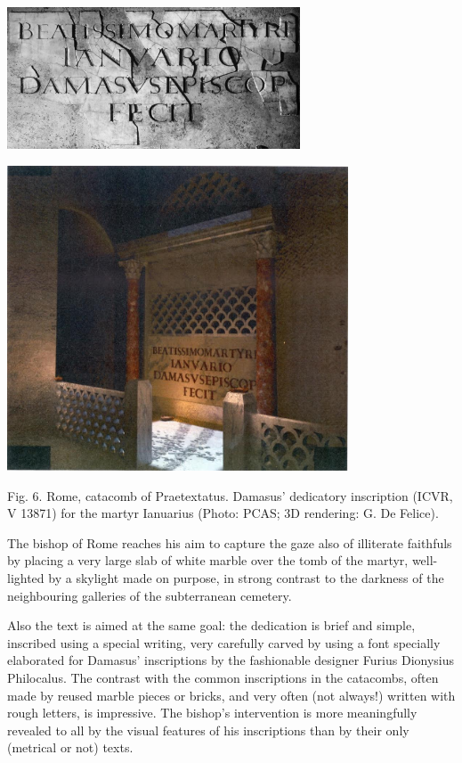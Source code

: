 \documentclass[amsthm,ebook]{saparticle}
\begin{document}
 \includegraphics[width=8.692cm,height=4.21cm]{FelleVisualFeaturesofinscriptionsEAGLE2016FullPaper-img008.jpg} 

 \includegraphics[width=10.141cm,height=9.059cm]{FelleVisualFeaturesofinscriptionsEAGLE2016FullPaper-img009.jpg} 

Fig. 6. Rome, catacomb of Praetextatus. Damasus’ dedicatory inscription (ICVR, V 13871) for the martyr Ianuarius (Photo:
PCAS; 3D rendering: G. De Felice).


\bigskip

The bishop of Rome reaches his aim to capture the gaze also of illiterate faithfuls by placing a very large slab of
white marble over the tomb of the martyr, well-lighted by a skylight made on purpose, in strong contrast to the
darkness of the neighbouring galleries of the subterranean cemetery. \ 

Also the text is aimed at the same goal: the dedication is brief and simple, inscribed using a special writing, very
carefully carved by using a font specially elaborated for Damasus' inscriptions by the fashionable designer Furius
Dionysius Philocalus. The contrast with the common inscriptions in the catacombs, often made by reused marble pieces or
bricks, and very often (not always!) written with rough letters, is impressive. The bishop's intervention is more
meaningfully revealed to all by the visual features of his inscriptions than by their only (metrical or not) texts. 
\end{document}
